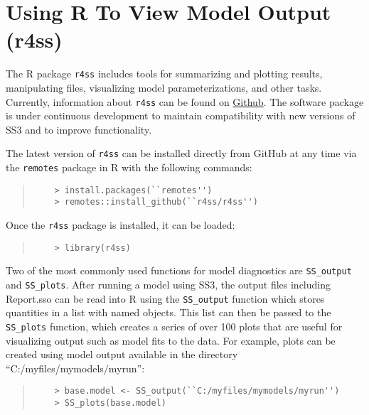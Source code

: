 
\section{Using R To View Model Output (r4ss)}\label{sec:r4ss}

The R package \texttt{r4ss} includes tools for summarizing and plotting results, manipulating files, visualizing model parameterizations, and other tasks. Currently, information about \texttt{r4ss} can be found on \href{https://github.com/r4ss/r4ss}{Github}.  The software package is under continuous development to maintain compatibility with new versions of SS3 and to improve functionality.

The latest version of \texttt{r4ss} can be installed directly from GitHub at any time via the \texttt{remotes} package in R with the following commands:

\begin{quote}
	\begin{verbatim}
	> install.packages(``remotes'')
	> remotes::install_github(``r4ss/r4ss'')
	\end{verbatim}
\end{quote}

Once the \texttt{r4ss} package is installed, it can be loaded:

\begin{quote}
	\begin{verbatim}
	> library(r4ss)
	\end{verbatim}
\end{quote}

Two of the most commonly used functions for model diagnostics are \texttt{SS\_output} and \texttt{SS\_plots}. After running a model using SS3, the output files including Report.sso can be read into R using the \texttt{SS\_output} function which stores quantities in a list with named objects.  This list can then be passed to the \texttt{SS\_plots} function, which creates a series of over 100 plots that are useful for visualizing output such as model fits to the data. For example, plots can be created using model output available in the directory ``C:/myfiles/mymodels/myrun'':

\begin{quote}
	\begin{verbatim}
	> base.model <- SS_output(``C:/myfiles/mymodels/myrun'')
	> SS_plots(base.model)
	\end{verbatim}
\end{quote}
  
